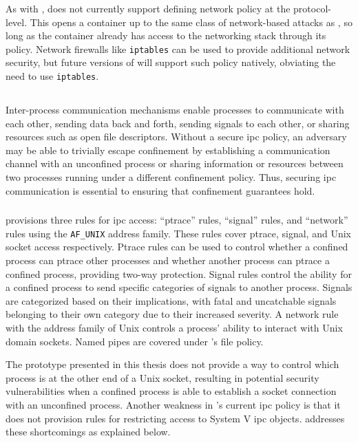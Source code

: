 As with \bpfbox{}, \bpfcontain{} does not currently support defining network policy at the
protocol-level. This opens a \bpfcontain{} container up to the same class of network-based
attacks as \bpfbox{}, so long as the container already has access to the networking stack
through its \bpfcontain{} policy. Network firewalls like \texttt{iptables} can be used to
provide additional network security, but future versions of \bpfcontain{} will support
such policy natively, obviating the need to use \texttt{iptables}.

\subsection{}

Inter-process communication mechanisms enable processes to communicate with each other,
sending data back and forth, sending signals to each other, or sharing resources such as
open file descriptors. Without a secure \gls{ipc} policy, an adversary may be able to
trivially escape confinement by establishing a communication channel with an unconfined
process or sharing information or resources between two processes running under
a different confinement policy. Thus, securing \gls{ipc} communication is essential to
ensuring that confinement guarantees hold.

\subsubsection{\bpfbox{}}

\bpfbox{} provisions three rules for \gls{ipc} access: \enquote{ptrace} rules,
\enquote{signal} rules, and \enquote{network} rules using the \texttt{AF\_UNIX} address
family. These rules cover ptrace, signal, and Unix socket access respectively. Ptrace
rules can be used to control whether a confined process can ptrace other processes and
whether another process can ptrace a confined process, providing two-way protection.
Signal rules control the ability for a confined process to send specific categories of
signals to another process. Signals are categorized based on their implications, with
fatal and uncatchable signals belonging to their own category due to their increased
severity. A network rule with the address family of Unix controls a process' ability to interact
with Unix domain sockets. Named pipes are covered under \bpfbox{}'s file policy.

The \bpfbox{} prototype presented in this thesis does not provide a way to control which
process is at the other end of a Unix socket, resulting in potential security
vulnerabilities when a confined process is able to establish a socket connection with an
unconfined process. Another weakness in \bpfbox{}'s current \gls{ipc} policy is that it
does not provision rules for restricting access to System V \gls{ipc} objects.
\bpfcontain{} addresses these shortcomings as explained below.

